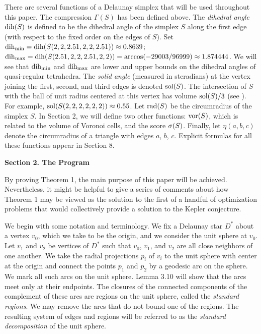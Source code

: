 \bigskip

There are several functions of a Delaunay simplex that will be
used throughout this paper.  The compression $\Gamma(S)$ has
been defined above.  The {\it dihedral angle\/} $\operatorname{dih}(S)$ is defined
to be the dihedral angle of the simplex $S$ along the first
edge (with respect to the fixed order on the edges of $S$).
Set 
$\operatorname{dih}_{\min} =  \operatorname{dih}(S(2,2,2.51,2,2,2.51))\approx 0.8639$;
$\operatorname{dih}_{\max} = \operatorname{dih}(S(2.51,2,2,2.51,2,2)) = 
	\arccos(-29003/96999) \approx 1.874444$.
We will see that $\operatorname{dih}_{\min}$ and $\operatorname{dih}_{\max}$ are lower and upper bounds
on the dihedral angles of quasi-regular tetrahedra.
The {\it solid angle\/} (measured in steradians) at the vertex
joining the first, second, and third edges is denoted
$\operatorname{sol}(S)$.  
The intersection of $S$ with the ball of unit
radius centered at this vertex has volume $\operatorname{sol}(S)/3$
(see \cite{H1,2.1}).  For example, $\operatorname{sol}(S(2,2,2,2,2,2))\approx 0.55$.
Let $\operatorname{rad}(S)$ be the circumradius of the simplex $S$.
In Section 2, we will define two other functions:
$\operatorname{vor}(S)$, which is related to the volume of Voronoi cells,
and the score $\sigma(S)$.
Finally, let $\eta(a,b,c)$ denote the circumradius of a triangle with
edges $a$, $b$, $c$.
Explicit formulas for all these functions appear in Section 8.


\bigskip
\centerline{\bf Section 2. The  Program}

By proving Theorem 1, the main purpose of this paper will be
achieved.  Nevertheless, it might be helpful to give a series of
comments about how Theorem 1 may be viewed as the
solution to the first of a handful of optimization problems that
would collectively provide a solution to the Kepler conjecture.

We begin with some notation and terminology.  We fix
a Delaunay star $D^*$ about a vertex $v_0$, which we
take to be the origin, and we consider the unit sphere at $v_0$.
Let $v_1$ and  $v_2$ be vertices of $D^*$ such that
$v_0$, $v_1$, and $v_2$ are all close neighbors of one another.
We take the radial projections $p_i$
of $v_i$ to the unit sphere with center at the origin
and connect the points $p_1$ and $p_2$ by a geodesic
arc on the sphere.  
We mark all such arcs on the unit sphere.
Lemma 3.10 will show that the arcs meet only at their endpoints.
The closures of the
connected components of the complement of these arcs are
regions on the unit sphere,
called the {\it standard regions}.  We may remove the arcs
that do not bound one of the regions.
The resulting system of edges and regions will be
referred to as the {\it standard decomposition\/} of the unit sphere.

